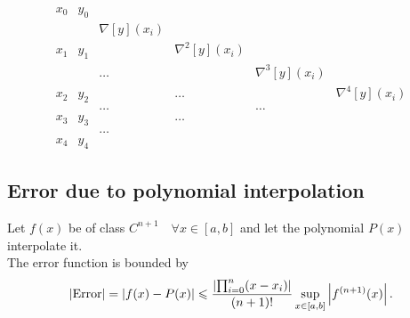 \documentclass{report}
\begin{document}
\[
	\begin{array}{cccccc}
		x_0 & y_0                                                                           \\
		    &     & \nabla[y](x_i)                                                          \\
		x_1 & y_1 &                & \nabla^2[y](x_i)                                       \\
		    &     & \dots          &                  & \nabla^3[y](x_i)                    \\
		x_2 & y_2 &                & \dots            &                  & \nabla^4[y](x_i) \\
		    &     & \dots          &                  & \dots                               \\
		x_3 & y_3 &                & \dots                                                  \\
		    &     & \dots                                                                   \\
		x_4 & y_4
	\end{array}
\]

\subsection{Error due to polynomial interpolation}

Let $f(x)$ be of class $C^{n+1} \quad \forall x \in [a,b]$ and let the polynomial $P(x)$ interpolate it. \\

The error function is bounded by
\[
	|\text{Error}| = |f(x) - P(x)| \leqslant \frac{\left| \prod_{i=0}^n (x-x_i) \right|}{(n+1)!} \sup_{x\in[a,b]} \left|f^{(n+1)}(x)\right|
	.\]
\end{document}
